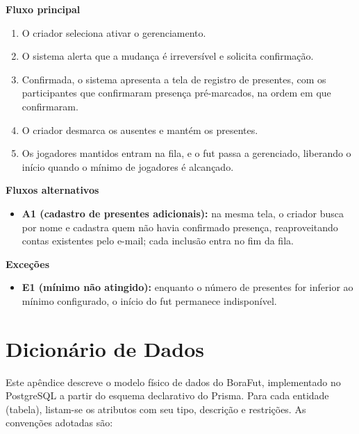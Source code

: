\begin{apendicesenv}
        \noindent\textbf{Fluxo principal}
        \begin{enumerate}
            \item O criador seleciona ativar o gerenciamento.
            \item O sistema alerta que a mudança é irreversível e solicita confirmação.
            \item Confirmada, o sistema apresenta a tela de registro de presentes, com os participantes que confirmaram presença pré-marcados, na ordem em que confirmaram.
            \item O criador desmarca os ausentes e mantém os presentes.
            \item Os jogadores mantidos entram na fila, e o fut passa a gerenciado, liberando o início quando o mínimo de jogadores é alcançado.
        \end{enumerate}

        \noindent\textbf{Fluxos alternativos}
        \begin{itemize}
            \item \textbf{A1 (cadastro de presentes adicionais):} na mesma tela, o criador busca por nome e cadastra quem não havia confirmado presença, reaproveitando contas existentes pelo e-mail; cada inclusão entra no fim da fila.
        \end{itemize}

        \noindent\textbf{Exceções}
        \begin{itemize}
            \item \textbf{E1 (mínimo não atingido):} enquanto o número de presentes for inferior ao mínimo configurado, o início do fut permanece indisponível.
        \end{itemize}

\chapter{Dicionário de Dados}
    \label{apendice:dicionario}

    Este apêndice descreve o modelo físico de dados do BoraFut, implementado no PostgreSQL a partir do esquema declarativo do Prisma. Para cada entidade (tabela), listam-se os atributos com seu tipo, descrição e restrições. As convenções adotadas são:


\end{apendicesenv}
